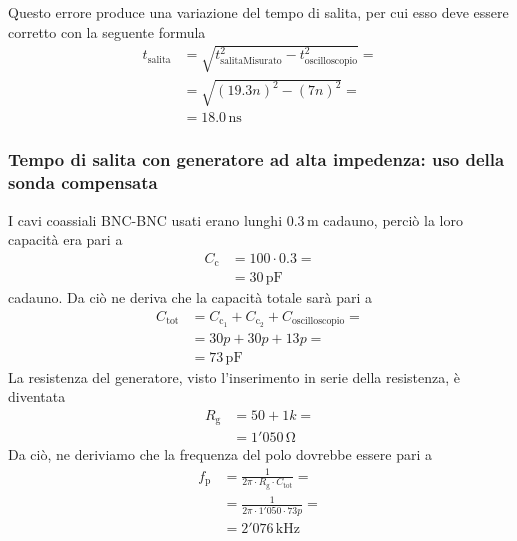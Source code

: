 \documentclass[a4paper]{article}
\begin{document}
				Questo errore produce una variazione del tempo di salita, per cui esso deve essere corretto con la seguente formula
				\begin{equation*}
					\begin{split}
						t_{\mathrm{salita}} &= \sqrt{t_{\mathrm{salitaMisurato}}^{2} - t_{\mathrm{oscilloscopio}}^{2}} = \\
											&= \sqrt{(19.3n)^{2} - (7n)^{2}} = \\
											&= 18.0 \, \mathrm{ns}
					\end{split}
				\end{equation*}
			\subsubsection{Tempo di salita con generatore ad alta impedenza: uso della sonda compensata}
				I cavi coassiali BNC-BNC usati erano lunghi $ 0.3 \, \mathrm{m} $ cadauno, perciò la loro capacità era pari a
				\begin{equation*}
					\begin{split}
						C_{\mathrm{c}} &= 100 \cdot 0.3 = \\
									   &= 30 \, \mathrm{pF}
					\end{split}
				\end{equation*}
				cadauno. Da ciò ne deriva che la capacità totale sarà pari a
				\begin{equation*}
					\begin{split}
						C_{\mathrm{tot}} &= C_{\mathrm{c_{1}}} + C_{\mathrm{c_{2}}} + C_{\mathrm{oscilloscopio}} = \\
										 &= 30p + 30p + 13p =\\
										 &= 73 \, \mathrm{pF}
					\end{split}
				\end{equation*}
				La resistenza del generatore, visto l'inserimento in serie della resistenza, è diventata
				\begin{equation*}
					\begin{split}
						R_{\mathrm{g}} &= 50 + 1k = \\
									   &= 1'050 \, \mathrm{\Omega}
					\end{split}
				\end{equation*}
				Da ciò, ne deriviamo che la frequenza del polo dovrebbe essere pari a
				\begin{equation*}
					\begin{split}
						f_{\mathrm{p}} &= \frac{1}{2 \pi \cdot R_{\mathrm{g}} \cdot C_{\mathrm{tot}}} = \\
									   &= \frac{1}{2 \pi \cdot 1'050 \cdot 73p} = \\
									   &= 2'076 \, \mathrm{kHz}
					\end{split}
				\end{equation*}
\end{document}
